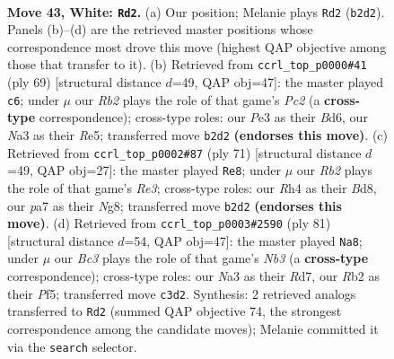 \documentclass[11pt]{article}
\begin{document}
\clearpage

\begin{figure}[p]\centering
\begin{subfigure}{0.46\textwidth}\centering
\resizebox{\linewidth}{!}{%
\newchessgame
\chessboard[
  setfen={1rr5/pn6/1p2p1kp/5p2/2P4R/N1B1P3/PR3PP1/5K2 w - - 0 43},
  showmover=false,
  pgfstyle=straightmove, color=movearrow, markmove={b2-d2}
]}
\caption{}
\end{subfigure}\hfill
\begin{subfigure}{0.46\textwidth}\centering
\resizebox{\linewidth}{!}{%
\newchessgame
\chessboard[
  setfen={8/2p3pk/3b1r2/P2pr2p/P3p3/2P3P1/5PNP/1R1R2K1 b - - 2 35},
  showmover=false,
  pgfstyle=straightmove, color=movearrow, markmove={c7-c6}
]}
\caption{}
\end{subfigure}
\\[4pt]
\begin{subfigure}{0.46\textwidth}\centering
\resizebox{\linewidth}{!}{%
\newchessgame
\chessboard[
  setfen={2kb2n1/2p2r2/p3r3/1pp1Pp2/7p/7P/PPP1N1PB/4RR1K b - - 5 36},
  showmover=false,
  pgfstyle=straightmove, color=movearrow, markmove={e6-e8}
]}
\caption{}
\end{subfigure}\hfill
\begin{subfigure}{0.46\textwidth}\centering
\resizebox{\linewidth}{!}{%
\newchessgame
\chessboard[
  setfen={8/p2r2p1/1n3k1p/1P3p2/1B1p4/PP4P1/2r2P2/3RR1K1 b - - 0 41},
  showmover=false,
  pgfstyle=straightmove, color=movearrow, markmove={b6-a8}
]}
\caption{}
\end{subfigure}
\caption{\textbf{Move 43, White: \texttt{Rd2}.} (a) Our position; Melanie plays \texttt{Rd2} (\texttt{b2d2}). Panels (b)--(d) are the retrieved master positions whose correspondence most drove this move (highest QAP objective among those that transfer to it). (b) Retrieved from \texttt{ccrl\_top\_p0000\#41} (ply 69) [structural distance $d$=49, QAP obj=47]: the master played \texttt{c6}; under $\mu$ our \emph{Rb2} plays the role of that game's \emph{Pc2} (a \textbf{cross-type} correspondence); cross-type roles: our \emph{P}e3 as their \emph{B}d6, our \emph{N}a3 as their \emph{R}e5; transferred move \texttt{b2d2} \textbf{(endorses this move)}. (c) Retrieved from \texttt{ccrl\_top\_p0002\#87} (ply 71) [structural distance $d$=49, QAP obj=27]: the master played \texttt{Re8}; under $\mu$ our \emph{Rb2} plays the role of that game's \emph{Re3}; cross-type roles: our \emph{R}h4 as their \emph{B}d8, our \emph{p}a7 as their \emph{N}g8; transferred move \texttt{b2d2} \textbf{(endorses this move)}. (d) Retrieved from \texttt{ccrl\_top\_p0003\#2590} (ply 81) [structural distance $d$=54, QAP obj=47]: the master played \texttt{Na8}; under $\mu$ our \emph{Bc3} plays the role of that game's \emph{Nb3} (a \textbf{cross-type} correspondence); cross-type roles: our \emph{N}a3 as their \emph{R}d7, our \emph{R}b2 as their \emph{P}f5; transferred move \texttt{c3d2}. Synthesis: 2 retrieved analogs transferred to \texttt{Rd2} (summed QAP objective 74, the strongest correspondence among the candidate moves); Melanie committed it via the \texttt{search} selector.}
\label{fig:thought-m84}
\end{figure}
\end{document}
